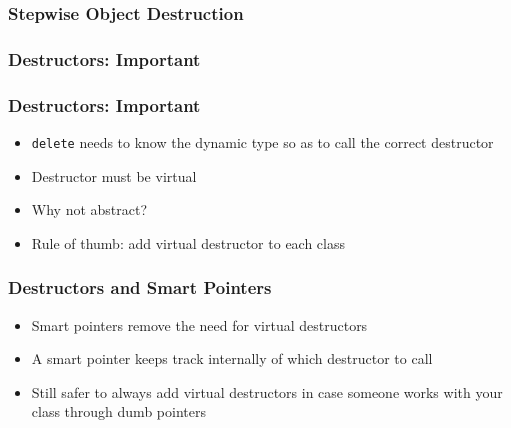 \begin{frame}
  \frametitle{Stepwise Object Destruction}
  \begin{center}
  \end{center}
\end{frame}

\begin{frame}
  \frametitle{Destructors: Important}
\end{frame}

\begin{frame}
  \frametitle{Destructors: Important}
  \begin{itemize}
    \item {\tt delete} needs to know the dynamic type so as to
          call the correct destructor
    \item Destructor must be virtual
          \vskip2mm
    \item Why not abstract? \cake
          \vskip2mm
    \item Rule of thumb: add virtual destructor to each class
  \end{itemize}
\end{frame}

\begin{frame}
  \frametitle{Destructors and Smart Pointers}
  \begin{itemize}
    \item Smart pointers remove the need for virtual destructors
    \item A smart pointer keeps track internally of which destructor to call
    \item Still safer to always add virtual destructors in case someone works with your class through dumb pointers
  \end{itemize}
\end{frame}





